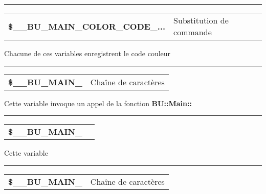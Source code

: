 \documentclass[a4paper,10pt]{article}
\begin{document}
\par\noindent\rule{\textwidth}{0.4pt}

\begin{justify}
    \begin{tabular}{l|l}
        \textbf{\color{vars}\$\_\_BU\_MAIN\_COLOR\_CODE\_...}  & Substitution de commande\\
    \end{tabular}
\end{justify}

\begin{justify}
    Chacune de ces variables enregistrent le code couleur 
\end{justify}


\par\noindent\rule{\textwidth}{0.4pt}

\begin{justify}
    \begin{tabular}{l|l}
        \textbf{\color{vars}\$\_\_BU\_MAIN\_}  & Chaîne de caractères \\[1\baselineskip]
    \end{tabular}
\end{justify}

\begin{justify}
    Cette variable invoque un appel de la fonction \textbf{\color{func}BU::Main::}
\end{justify}


\par\noindent\rule{\textwidth}{0.4pt}

\begin{justify}
    \begin{tabular}{l|l}
        \textbf{\color{vars}\$\_\_BU\_MAIN\_}   & \\[1\baselineskip]
    \end{tabular}
\end{justify}

\begin{justify}
    Cette variable
\end{justify}


\par\noindent\rule{\textwidth}{0.4pt}

\begin{justify}
    \begin{tabular}{l|l}
                \textbf{\color{vars}\$\_\_BU\_MAIN\_}  & Chaîne de caractères \\[1\baselineskip]
    \end{tabular}
\end{justify}
\end{document}
